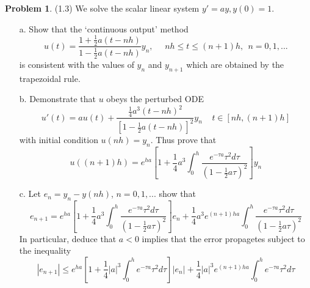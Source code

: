 \documentclass[a4paper, 10pt]{article}
\theoremstyle{definition}
\newtheorem{problem}{Problem}
\theoremstyle{hSol}
\begin{document}
\begin{problem} (1.3) We solve the scalar linear system $y'=ay, y(0)=1$.
\begin{itemize}
  \item[a.] Show that the `continuous output' method
  $$
  u(t) = \frac{1+\frac{1}{2}a(t-nh)}{1-\frac{1}{2}a(t-nh)} y_n, ~~~~~~nh\leq t \leq (n+1)h,~~n=0,1,...
  $$
  is consistent with the values of $y_n$ and $y_{n+1}$ which are obtained by the trapezoidal rule.
  \item[b.] Demonstrate that $u$ obeys the perturbed ODE
  $$
  u'(t) = au(t) + \frac{\frac{1}{4}a^3 (t-nh)^2}{[1-\frac{1}{2}a(t-nh)]^2} y_n~~~~~t\in [nh, (n+1)h]
  $$
  with initial condition $u(nh)=y_n$. Thus prove that 
  $$
  u((n+1)h) = e^{ha} \left[1+\frac{1}{4}a^3 \int_0^h \frac{e^{-\tau a} \tau^2 d\tau}{(1-\frac{1}{2}a \tau)^2}\right] y_n
  $$
  \item[c.] Let $e_n = y_n - y(nh)$, $n=0,1,...$ show that
  $$
  e_{n+1} = e^{ha} \left[1+\frac{1}{4}a^3 \int_0^h \frac{e^{-\tau a} \tau^2 d\tau}{(1-\frac{1}{2}a \tau)^2}\right]e_n + \frac{1}{4}a^3e^{(n+1)ha}  \int_0^h \frac{e^{-\tau a} \tau^2 d\tau}{(1-\frac{1}{2}a \tau)^2}
  $$
  In particular, deduce that $a<0$ implies that the error propagetes subject to the inequality
  $$
  |e_{n+1}| \leq e^{ha} \left[1+\frac{1}{4}|a|^3 \int_0^h e^{-\tau a} \tau^2 d\tau\right]|e_n| + \frac{1}{4}|a|^3e^{(n+1)ha}  \int_0^h e^{-\tau a} \tau^2 d\tau
  $$

\end{itemize}
\end{problem}
\end{document}
